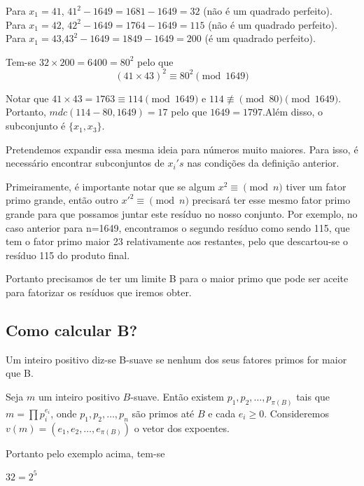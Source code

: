 \begin{center}
\justify
Para $x_1=41$, $41^2 - 1649 = 1681 - 1649=32$ (não é um quadrado perfeito). \\
Para $x_1=42$, $42^2 - 1649 = 1764 - 1649 = 115$ (não é um quadrado perfeito). \\
Para $x_1=43$,$43^2 - 1649= 1849 - 1649= 200$ (é um quadrado perfeito).
\end{center}

Tem-se 
$32 \times 200=6400=80^2$ pelo que $$(41\times43)^2 \equiv 80^2 \pmod {1649}$$

Notar que $41\times43=1763 \equiv114 \pmod {1649}$ e $114 \not\equiv \pmod 80\pmod {1649}$. Portanto, $mdc(114-80,1649)=17$ pelo que $1649=1797$.Além disso, o subconjunto é $\{x_1,x_3\}$.

Pretendemos expandir essa mesma ideia para números muito maiores. Para isso, é necessário encontrar subconjuntos de $x_i's$ nas condições da definição anterior.

Primeiramente, é importante notar que se algum $x^2 \equiv \pmod {n}$ tiver um fator primo grande, então outro ${x'}^2 \equiv \pmod {n}$  precisará ter esse mesmo fator primo grande para que possamos juntar este resíduo no nosso conjunto. Por exemplo, no caso anterior para  n=1649, encontramos o segundo resíduo como sendo 115, que tem o fator primo maior 23 relativamente aos restantes, pelo que descartou-se o resíduo 115 do  produto final. 

Portanto precisamos de ter um limite B para o maior primo que pode ser aceite para fatorizar os resíduos que iremos obter.

\subsection{Como calcular B?}

\begin{definicao}[B-suave] Um inteiro positivo diz-se B-suave se nenhum dos seus fatores primos for maior   que B.
\end{definicao}

Seja \( m \) um inteiro positivo \( B \)-suave. Então existem \( p_1, p_2, \dots, p_{\pi(B)} \) tais que \( m = \prod p_i^{e_i} \), onde \( p_1, p_2, \dots, p_n \) são primos até \( B \) e cada \( e_i \geq 0 \). Consideremos $v(m)=(e_1,e_2,\dots,e_{\pi(B)})$ o vetor dos expoentes.

Portanto pelo  exemplo acima, tem-se

$32=2^5$

